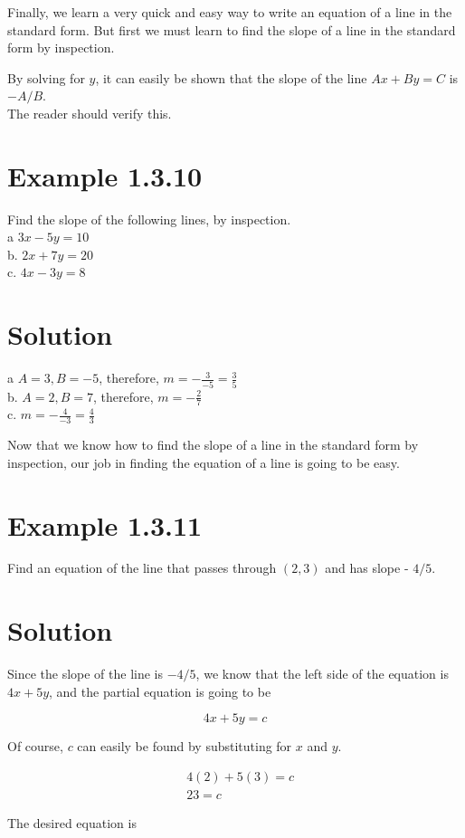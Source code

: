Finally, we learn a very quick and easy way to write an equation of a line in the standard form. But first we must learn to find the slope of a line in the standard form by inspection.

By solving for $y$, it can easily be shown that the slope of the line $A x+B y=C$ is $-A / B$.\\
The reader should verify this.

\section*{Example 1.3.10}
Find the slope of the following lines, by inspection.\\
a $3 x-5 y=10$\\
b. $2 x+7 y=20$\\
c. $4 x-3 y=8$

\section*{Solution}
a $A=3, B=-5$, therefore, $m=-\frac{3}{-5}=\frac{3}{5}$\\
b. $A=2, B=7$, therefore, $m=-\frac{2}{7}$\\
c. $m=-\frac{4}{-3}=\frac{4}{3}$

Now that we know how to find the slope of a line in the standard form by inspection, our job in finding the equation of a line is going to be easy.

\section*{Example 1.3.11}
Find an equation of the line that passes through $(2,3)$ and has slope - $4 / 5$.

\section*{Solution}
Since the slope of the line is $-4 / 5$, we know that the left side of the equation is $4 x+5 y$, and the partial equation is going to be

$$
4 x+5 y=c
$$

Of course, $c$ can easily be found by substituting for $x$ and $y$.

$$
\begin{aligned}
& 4(2)+5(3)=c \\
& 23=c
\end{aligned}
$$

The desired equation is

